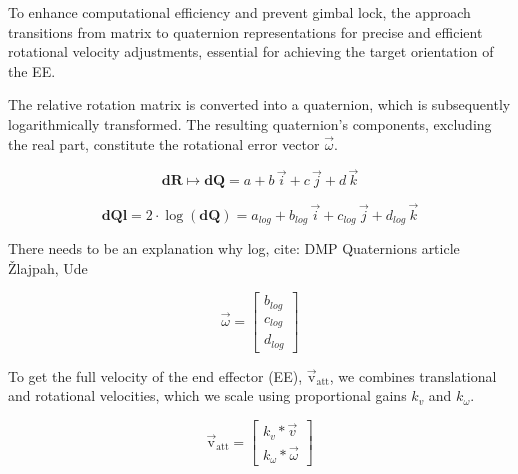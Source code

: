 \documentclass[letterpaper, 10 pt, conference]{ieeeconf}  %
\begin{document}
To enhance computational efficiency and prevent gimbal lock, the approach transitions from matrix to quaternion representations for precise and efficient rotational velocity adjustments, essential for achieving the target orientation of the EE.

The relative rotation matrix is converted into a quaternion, which is subsequently logarithmically transformed. The resulting quaternion's components, excluding the real part, constitute the rotational error vector \( \vec{\omega} \).
%
%

\begin{equation}
	\boldsymbol{dR} \mapsto \boldsymbol{dQ} = a + b \, \vec{i} + c \, \vec{j} + d \, \vec{k}
	\label{eq: quat_mapsto}
\end{equation}

\begin{equation}
	\boldsymbol{dQl} = 2 \cdot \log(\boldsymbol{dQ}) = a_{log} + b_{log} \, \vec{i} + c_{log} \, \vec{j} + d_{log} \, \vec{k}
	\label{eq:quat_log}
\end{equation}

\alert{There needs to be an explanation why log, cite: DMP Quaternions article Žlajpah, Ude}



\begin{equation}
	\vec{\omega} =
	\begin{bmatrix}
		b_{log} \\
		c_{log} \\
		d_{log}
	\end{bmatrix}
	\label{eq:rot_error_vector}
\end{equation}

To get the full velocity of the end effector (EE), \( \mathrm{\vec{v}_{att}} \), we combines translational and rotational velocities, which we scale using proportional gains \( k_v \) and \( k_\omega \).

\begin{equation}
	\mathrm{\vec{v}_{att}} = 
	\begin{bmatrix}
		k_{v} * \vec{v}   \\
		k_{\omega} * \vec{\omega}
	\end{bmatrix}
	\label{eq:ee_velocity}
\end{equation}
\end{document}

